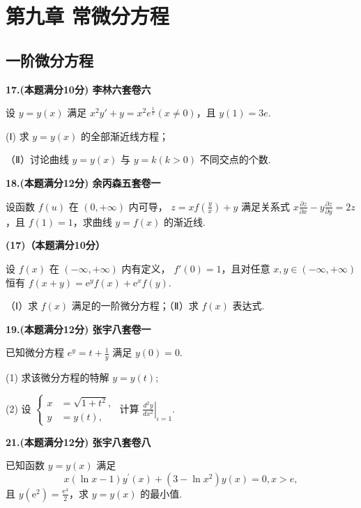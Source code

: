 \documentclass[a4paper,12pt]{article}
\begin{document}
\section{第九章 常微分方程}

\subsection{一阶微分方程}

\textbf{17.(本题满分10分) 李林六套卷六}

设 $y = y(x)$ 满足 $x^{2}y' + y = x^{2}e^{\frac{1}{x}}(x \neq 0)$，且 $y(1) = 3e$.

(Ⅰ) 求 $y = y(x)$ 的全部渐近线方程；

（Ⅱ）讨论曲线 $y = y(x)$ 与 $y = k(k > 0)$ 不同交点的个数.

\vspace{0.5cm}

\textbf{18.(本题满分12分) 余丙森五套卷一}

设函数 $ f(u) $ 在 $(0, +\infty)$ 内可导， $ z = xf\left(\frac{y}{x}\right) + y $ 满足关系式 $x \frac{\partial z}{\partial x} - y \frac{\partial z}{\partial y} = 2z$，且 $ f(1) = 1 $，求曲线 $ y = f(x) $ 的渐近线.

\vspace{0.5cm}

\textbf{(17)（本题满分10分）}

设 $f(x)$ 在 $(-\infty, +\infty)$ 内有定义， $f'(0) = 1$，且对任意 $x, y \in (-\infty, +\infty)$ 恒有 $f(x + y) = \mathrm{e}^{y} f(x) + \mathrm{e}^{x} f(y)$.

（Ⅰ）求 $f(x)$ 满足的一阶微分方程；（Ⅱ）求 $f(x)$ 表达式.

\vspace{0.5cm}

\textbf{19.(本题满分12分) 张宇八套卷一}

已知微分方程 $e^{y}=t+\frac{1}{y}$ 满足 $y(0)=0.$

(1) 求该微分方程的特解 $y = y(t)$;

(2) 设 $\left\{\begin{aligned} x &= \sqrt{1 + t^{2}}, \\ y &= y(t), \end{aligned}\right.$ 计算 $\left.\frac{d^{2}y}{dx^{2}}\right|_{\iota=1}$.

\vspace{0.5cm}

\textbf{21.(本题满分12分) 张宇八套卷八}

已知函数 $y = y(x)$ 满足
\[ x(\ln x-1)y^{\prime}(x)+(3-\ln x^{2})y(x)=0,x>e, \]
且 $y(\mathrm{e}^{2})=\frac{\mathrm{e}^{4}}{2}$，求 $y=y(x)$ 的最小值.
\end{document}
